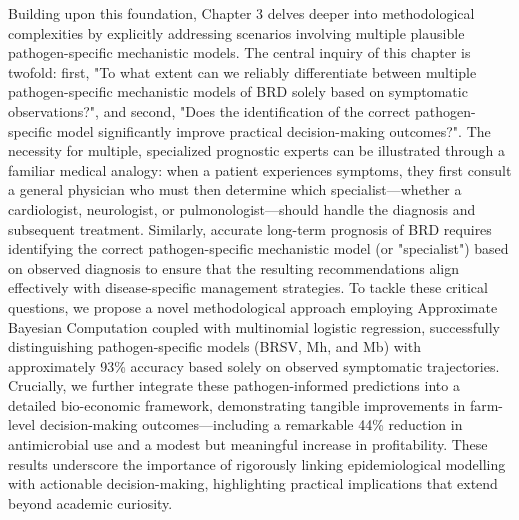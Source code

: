 Building upon this foundation, Chapter 3 delves deeper into methodological complexities by explicitly addressing scenarios involving multiple plausible pathogen-specific mechanistic models. The central inquiry of this chapter is twofold: first, "To what extent can we reliably differentiate between multiple pathogen-specific mechanistic models of BRD solely based on symptomatic observations?", and second, "Does the identification of the correct pathogen-specific model significantly improve practical decision-making outcomes?". The necessity for multiple, specialized prognostic experts can be illustrated through a familiar medical analogy: when a patient experiences symptoms, they first consult a general physician who must then determine which specialist—whether a cardiologist, neurologist, or pulmonologist—should handle the diagnosis and subsequent treatment. Similarly, accurate long-term prognosis of BRD requires identifying the correct pathogen-specific mechanistic model (or "specialist") based on observed diagnosis to ensure that the resulting recommendations align effectively with disease-specific management strategies. To tackle these critical questions, we propose a novel methodological approach employing Approximate Bayesian Computation coupled with multinomial logistic regression, successfully distinguishing pathogen-specific models (BRSV, Mh, and Mb) with approximately 93\% accuracy based solely on observed symptomatic trajectories. Crucially, we further integrate these pathogen-informed predictions into a detailed bio-economic framework, demonstrating tangible improvements in farm-level decision-making outcomes—including a remarkable 44\% reduction in antimicrobial use and a modest but meaningful increase in profitability. These results underscore the importance of rigorously linking epidemiological modelling with actionable decision-making, highlighting practical implications that extend beyond academic curiosity.

